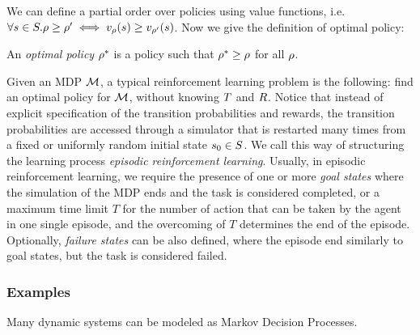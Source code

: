 We can define a partial order over policies using value functions, i.e. $\forall s\in S. \rho \ge \rho' \iff v_\rho(s) \ge v_{\rho'}(s)$. 
Now we give the definition of optimal policy:
\begin{definition}\label{def:optimal-policy}
	An \emph{optimal policy} $\rho^*$ is a policy such that $\rho^* \ge \rho$ for all $\rho$. 
\end{definition}

Given an MDP $\mathcal{M}$, a typical reinforcement learning problem is the following: find an optimal policy for $\mathcal{M}$, without knowing $T$ and $R$. Notice that instead of explicit specification of the transition probabilities and rewards, the transition probabilities are accessed through a simulator that is restarted many times from a fixed or uniformly random initial state $s_0\in S$. We call this way of structuring the learning process \emph{episodic reinforcement learning}. Usually, in episodic reinforcement learning, we require the presence of one or more \emph{goal states} where the simulation of the MDP ends and the task is considered completed, or a maximum time limit $T$ for the number of action that can be taken by the agent in one single episode, and the overcoming of $T$ determines the end of the episode. Optionally, \emph{failure states} can be also defined, where the episode end similarly to goal states, but the task is considered failed.

\subsubsection{Examples}
Many dynamic systems can be modeled as Markov Decision Processes. 

